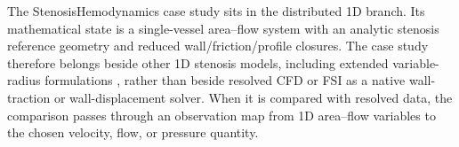 \begin{stenosisillustration}
\label{ex:stenosisillustration-model-hierarchy}
The StenosisHemodynamics case study sits in the distributed 1D branch. Its
mathematical state is a single-vessel area--flow system with an analytic
stenosis reference geometry and reduced wall/friction/profile closures. The
case study therefore belongs beside other 1D stenosis models, including
extended variable-radius formulations \cite{CanicEtAl2024Extended1DStenosis},
rather than beside resolved CFD or FSI as a native wall-traction or
wall-displacement solver. When it is compared with resolved data, the
comparison passes through an observation map from 1D area--flow variables to the
chosen velocity, flow, or pressure quantity.
\end{stenosisillustration}
